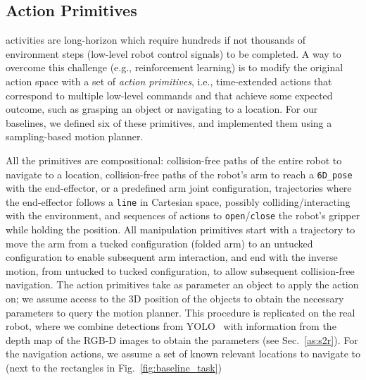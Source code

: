 \subsection{Action Primitives} 
\benchmark activities are long-horizon which require hundreds if not thousands of environment steps (low-level robot control signals) to be completed.  A way to overcome this challenge (e.g., reinforcement learning) is to modify the original action space with a set of \textit{action primitives}, i.e., time-extended actions that correspond to multiple low-level commands and that achieve some expected outcome, such as grasping an object or navigating to a location. For our baselines, we defined six of these primitives, and implemented them using a sampling-based motion planner.

All the primitives are compositional: collision-free paths of the entire robot to navigate to a location, collision-free paths of the robot's arm to reach a \texttt{6D\_pose} with the end-effector, or a predefined arm joint configuration, trajectories where the end-effector follows a \texttt{line} in Cartesian space, possibly colliding/interacting with the environment, and sequences of actions to \texttt{open}/\texttt{close} the robot's gripper while holding the position.
All manipulation primitives start with a trajectory to move the arm from a tucked configuration (folded arm) to an untucked configuration to enable subsequent arm interaction, and end with the inverse motion, from untucked to tucked configuration, to allow subsequent collision-free navigation.
The action primitives take as parameter an object to apply the action on; we assume access to the 3D position of the objects to obtain the necessary parameters to query the motion planner. This procedure is replicated on the real robot, where we combine detections from YOLO~\cite{redmon2018yolov3} with information from the depth map of the RGB-D images to obtain the parameters (see Sec.~\ref{as:s2r}). For the navigation actions, we assume a set of known relevant locations to navigate to (next to the rectangles in Fig.~\ref{fig:baseline_task}) 

